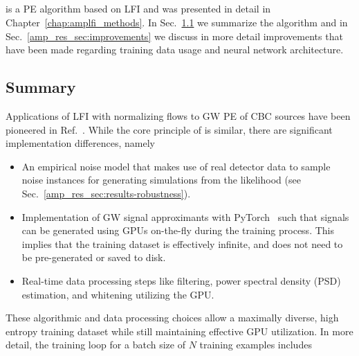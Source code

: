 \begin{refsection}
\section{\amplfi} \label{amp_res_sec:review}
\amplfi is a PE algorithm based on LFI and was presented in detail in Chapter~\ref{chap:amplfi_methods}. 
In Sec.~\ref{amp_res_sec:amplfi-summary} we summarize the algorithm and in Sec.~\ref{amp_res_sec:improvements} we discuss in more detail improvements that have been made regarding training data usage and neural network architecture.

\subsection{Summary} \label{amp_res_sec:amplfi-summary}
Applications of LFI with normalizing flows to GW PE of CBC sources have been pioneered in Ref.~\cite{Dax_2021}. 
While the core principle of \amplfi is similar, there are significant implementation differences, namely

\begin{itemize}
    \item An empirical noise model that makes use of real detector data to sample noise instances for generating simulations from the likelihood (see Sec.~\ref{amp_res_sec:results-robustness}).
    \item Implementation of GW signal approximants with PyTorch~\cite{Bellm_2018} such that signals can be generated using GPUs on-the-fly during the training process. 
    This implies that the training dataset is effectively infinite, and does not need to be pre-generated or saved to disk.
    \item Real-time data processing steps like filtering, power spectral density (PSD) estimation, and whitening utilizing the GPU.
\end{itemize}
These algorithmic and data processing choices allow a maximally diverse, high entropy training dataset while still maintaining effective GPU utilization. 
In more detail, the training loop for a batch size of $N$ training examples includes


\end{refsection}
